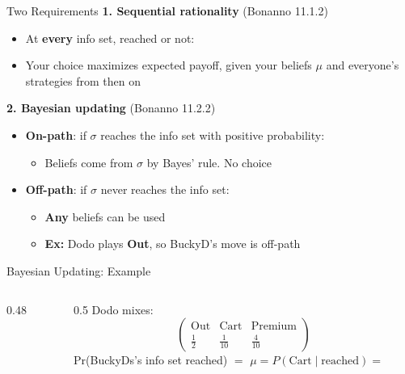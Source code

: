 \begin{frame}{Two Requirements}
\textbf{1. Sequential rationality} (Bonanno 11.1.2)
\begin{itemize}
    \item At \textbf{every} info set, reached or not:
    \item Your choice maximizes expected payoff, given your beliefs $\mu$ and everyone's strategies from then on
\end{itemize}
\bsk
\textbf{2. Bayesian updating} (Bonanno 11.2.2)
\begin{itemize}
    \item \textbf{On-path}: if $\sigma$ reaches the info set with positive probability:
    \begin{itemize}
        \item Beliefs come from $\sigma$ by Bayes' rule. No choice
    \end{itemize}
    \item \textbf{Off-path}: if $\sigma$ never reaches the info set:
    \begin{itemize}
        \item \textbf{Any} beliefs can be used
        \item \textbf{Ex:} Dodo plays \textbf{Out}, so BuckyD's move is off-path
    \end{itemize}
\end{itemize}
\vspace{-0.2in}
\end{frame}

\begin{frame}{Bayesian Updating: Example}
\begin{columns}[c]
\begin{column}{0.48\textwidth}
\centering
\donuttree[0.78]{}
\end{column}
\begin{column}{0.5\textwidth}
Dodo mixes:
$$\begin{pmatrix} \text{Out} & \text{Cart} & \text{Premium} \\ \tfrac12 & \tfrac{1}{10} & \tfrac{4}{10}\end{pmatrix}$$
Pr(BuckyDs's info set reached) $=$ 
\bsk
$\mu=P(\text{Cart}\mid\text{reached})=$ 
\end{column}
\end{columns}
\bsk
{}
\bsk
{}
\vspace{-0.3in}
\end{frame}

